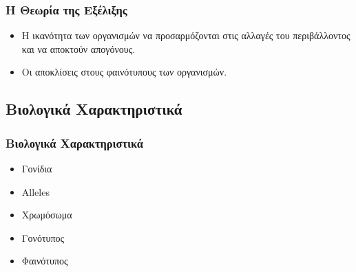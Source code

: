 \documentclass[xetex,mathserif,serif,14pt]{beamer}
\begin{document}
\begin{frame}

\frametitle{Η Θεωρία της Εξέλιξης}
\begin{itemize}
  \item Η ικανότητα των οργανισμών να προσαρμόζονται στις αλλαγές του περιβάλλοντος και να αποκτούν απογόνους.\pause
  \item Οι αποκλίσεις στους φαινότυπους των οργανισμών.
\end{itemize}
\end{frame}

\subsection{Βιολογικά Χαρακτηριστικά}

\begin{frame}
\frametitle{Βιολογικά Χαρακτηριστικά}
    \begin{itemize}
      \item Γονίδια\pause
      \item Alleles\pause
      \item Χρωμόσωμα\pause
      \item Γονότυπος\pause
      \item Φαινότυπος
    \end{itemize}
\end{frame}
\end{document}
